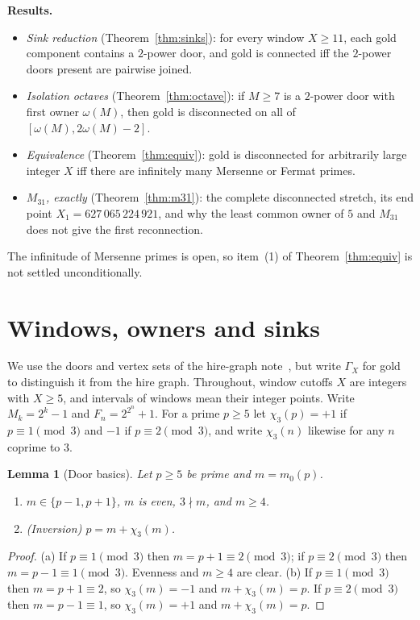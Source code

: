\documentclass[11pt,a4paper]{article}
\newtheorem{lemma}[theorem]{Lemma}
\theoremstyle{remark}
\newcommand{\chit}{\chi_3}
\begin{document}
\medskip
\noindent\textbf{Results.}
\begin{itemize}
\item \emph{Sink reduction} (Theorem~\ref{thm:sinks}): for every window \(X\ge 11\), each gold component contains a \(2\)-power door, and gold is connected iff the \(2\)-power doors present are pairwise joined.
\item \emph{Isolation octaves} (Theorem~\ref{thm:octave}): if \(M\ge 7\) is a \(2\)-power door with first owner \(\omega(M)\), then gold is disconnected on all of \([\omega(M),2\omega(M)-2]\).
\item \emph{Equivalence} (Theorem~\ref{thm:equiv}): gold is disconnected for arbitrarily large integer \(X\) iff there are infinitely many Mersenne or Fermat primes.
\item \emph{\(M_{31}\), exactly} (Theorem~\ref{thm:m31}): the complete disconnected stretch, its end point \(X_1=627\,065\,224\,921\), and why the least common owner of \(5\) and \(M_{31}\) does not give the first reconnection.
\end{itemize}
The infinitude of Mersenne primes is open, so item~(1) of Theorem~\ref{thm:equiv} is not settled unconditionally.

\section{Windows, owners and sinks}

We use the doors and vertex sets of the hire-graph note~\cite{Hire}, but write \(\Gamma_X\) for gold to distinguish it from the hire graph.
Throughout, window cutoffs \(X\) are integers with \(X\ge5\), and intervals of windows mean their integer points.
Write \(M_k=2^k-1\) and \(F_n=2^{2^n}+1\).
For a prime \(p\ge 5\) let \(\chit(p)=+1\) if \(p\equiv 1\pmod 3\) and \(-1\) if \(p\equiv 2\pmod 3\), and write \(\chit(n)\) likewise for any \(n\) coprime to \(3\).

\begin{lemma}[Door basics]\label{lem:door}
Let \(p\ge 5\) be prime and \(m=m_0(p)\).
\begin{enumerate}
\item[(a)] \(m\in\{p-1,p+1\}\), \(m\) is even, \(3\nmid m\), and \(m\ge 4\).
\item[(b)] (Inversion) \(p=m+\chit(m)\).
\end{enumerate}
\end{lemma}
\begin{proof}
(a) If \(p\equiv1\pmod 3\) then \(m=p+1\equiv 2\pmod 3\); if \(p\equiv 2\pmod 3\) then \(m=p-1\equiv 1\pmod 3\). Evenness and \(m\ge 4\) are clear.
(b) If $p\equiv1\pmod 3$ then $m=p+1\equiv2$, so $\chit(m)=-1$ and $m+\chit(m)=p$.
If $p\equiv2\pmod 3$ then $m=p-1\equiv1$, so $\chit(m)=+1$ and $m+\chit(m)=p$.
\end{proof}
\end{document}
